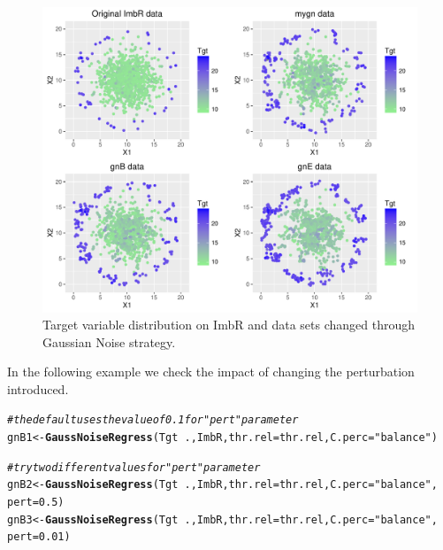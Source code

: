 \documentclass[10pt,a4paper]{article}\usepackage[]{graphicx}\usepackage[]{color}
\makeatletter
\def\maxwidth{ %
  \ifdim\Gin@nat@width>\linewidth
    \linewidth
  \else
    \Gin@nat@width
  \fi
}
\newcommand{\hlnum}[1]{\textcolor[rgb]{0.686,0.059,0.569}{#1}}%
\newcommand{\hlstr}[1]{\textcolor[rgb]{0.192,0.494,0.8}{#1}}%
\newcommand{\hlcom}[1]{\textcolor[rgb]{0.678,0.584,0.686}{\textit{#1}}}%
\newcommand{\hlopt}[1]{\textcolor[rgb]{0,0,0}{#1}}%
\newcommand{\hlstd}[1]{\textcolor[rgb]{0.345,0.345,0.345}{#1}}%
\newcommand{\hlkwb}[1]{\textcolor[rgb]{0.69,0.353,0.396}{#1}}%
\newcommand{\hlkwc}[1]{\textcolor[rgb]{0.333,0.667,0.333}{#1}}%
\newcommand{\hlkwd}[1]{\textcolor[rgb]{0.737,0.353,0.396}{\textbf{#1}}}%
\newenvironment{kframe}{%
 \def\at@end@of@kframe{}%
 \ifinner\ifhmode%
  \def\at@end@of@kframe{\end{minipage}}%
  \begin{minipage}{\columnwidth}%
 \fi\fi%
 \def\FrameCommand##1{\hskip\@totalleftmargin \hskip-\fboxsep
 \colorbox{shadecolor}{##1}\hskip-\fboxsep
     \hskip-\linewidth \hskip-\@totalleftmargin \hskip\columnwidth}%
 \MakeFramed {\advance\hsize-\width
   \@totalleftmargin\z@ \linewidth\hsize
   \@setminipage}}%
 {\par\unskip\endMakeFramed%
 \at@end@of@kframe}
\newenvironment{knitrout}{}{} %
\makeatother
\begin{document}
\begin{knitrout}\footnotesize
{}\color{fgcolor}\begin{figure}

{\centering \includegraphics[width=\maxwidth]{figures/UBL-GN_plot_new-1} 

}

\caption[Target variable distribution on ImbR and data sets changed through Gaussian Noise strategy]{Target variable distribution on ImbR and data sets changed through Gaussian Noise strategy.}\label{fig:GN_plot_new}
\end{figure}


\end{knitrout}

In the following example we check the impact of changing the perturbation introduced.

\begin{knitrout}\footnotesize
{}\color{fgcolor}\begin{kframe}
\begin{alltt}
\hlcom{# the default uses the value of 0.1 for "pert" parameter}
\hlstd{gnB1} \hlkwb{<-} \hlkwd{GaussNoiseRegress}\hlstd{(Tgt}\hlopt{~}\hlstd{., ImbR,} \hlkwc{thr.rel}\hlstd{=thr.rel,} \hlkwc{C.perc}\hlstd{=}\hlstr{"balance"}\hlstd{)}

\hlcom{# try two different values for "pert" parameter}
\hlstd{gnB2} \hlkwb{<-} \hlkwd{GaussNoiseRegress}\hlstd{(Tgt}\hlopt{~}\hlstd{., ImbR,} \hlkwc{thr.rel}\hlstd{=thr.rel,} \hlkwc{C.perc}\hlstd{=}\hlstr{"balance"}\hlstd{,}
                          \hlkwc{pert}\hlstd{=}\hlnum{0.5}\hlstd{)}
\hlstd{gnB3} \hlkwb{<-} \hlkwd{GaussNoiseRegress}\hlstd{(Tgt}\hlopt{~}\hlstd{., ImbR,} \hlkwc{thr.rel}\hlstd{=thr.rel,} \hlkwc{C.perc}\hlstd{=}\hlstr{"balance"}\hlstd{,}
                          \hlkwc{pert}\hlstd{=}\hlnum{0.01}\hlstd{)}
\end{alltt}
\end{kframe}
\end{knitrout}
\end{document}
